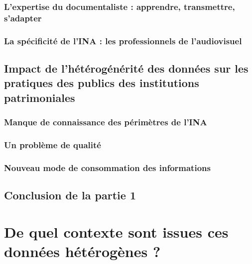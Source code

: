 \documentclass[12pt,twoside, openany]{book} %
\begin{document}
		
		
		\section{L'expertise du documentaliste : apprendre, transmettre, s'adapter}
		
		
		
		\section{La spécificité de l'INA : les professionnels de l'audiovisuel}
		
		
	
	\chapter{Impact de l'hétérogénérité des données sur les pratiques des publics des institutions patrimoniales}
		
		\section{Manque de connaissance des périmètres de l'INA}
		
		
		
		\section{Un problème de qualité}
		
		
		
		\section{Nouveau mode de consommation des informations}
		
		
		
\chapter*{Conclusion de la partie 1}


		
	
\part{De quel contexte sont issues ces données hétérogènes ?}
\end{document}
